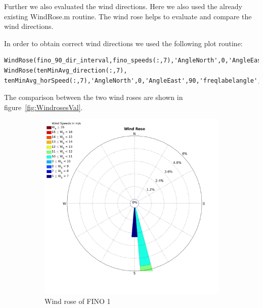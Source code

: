 \documentclass[10pt]{article}
\begin{document}
Further we also evaluated the wind directions. Here we also used the already existing WindRose.m routine. The wind rose helps to evaluate and compare the wind directions.

In order to obtain correct wind directions we used the following plot routine:\\
\begin{lstlisting}
WindRose(fino_90_dir_interval,fino_speeds(:,7),'AngleNorth',0,'AngleEast',90,'freqlabelangle',45,'MaxFrequency',6);
WindRose(tenMinAvg_direction(:,7), tenMinAvg_horSpeed(:,7),'AngleNorth',0,'AngleEast',90,'freqlabelangle',45,'MaxFrequency',6);
\end{lstlisting}

The comparison between the two wind roses are shown in figure~\ref{fig:WindrosesVal}. 

\begin{figure}[htb!]
\label{fig:WindRose1_valdidation}
\begin{subfigure}{0.5\textwidth}
  \centering
  \includegraphics[width=1\linewidth]{../Exercises_and_Tasks/ex2/figures/WindRose_Fino1.png}
  \caption{Wind rose of FINO 1}
\end{subfigure}
\begin{subfigure}{0.5\textwidth}
  \centering

\end{subfigure}
\end{figure}
\end{document}
